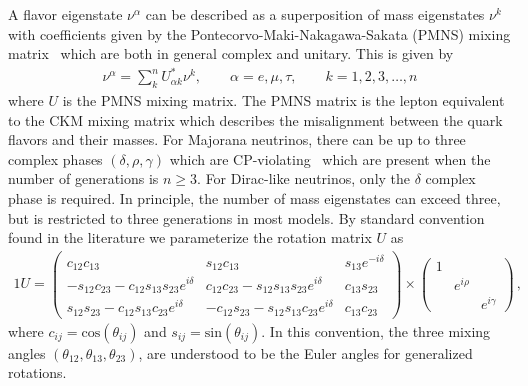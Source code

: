 \documentclass[universe,article,submit,moreauthors,pdftex,a4paper]{Definitions/mdpi}
\begin{document}
A flavor eigenstate $\nu^{\alpha}$ can be described as a superposition of mass eigenstates $\nu^{k}$ with coefficients given by the Pontecorvo-Maki-Nakagawa-Sakata (PMNS) mixing matrix~\cite{King:2013eh,FernandezMartinez:2016lgt} which are both in general  complex and unitary. This is given by
\begin{align}\label{NuFlavors}
	\nu^{\alpha}=\sum_k^nU^\ast_{\alpha k}\nu^{k}, \qquad\alpha=e,\mu,\tau,\qquad k=1,2,3,\dots,n
\end{align}
where $U$ is the PMNS mixing matrix. The PMNS matrix is the lepton equivalent to the CKM mixing matrix which describes the misalignment between the quark flavors and their masses. For Majorana neutrinos, there can be up to three complex phases $(\delta,\rho,\gamma)$ which are CP-violating~\cite{Pascoli:2006ci} which are present when the number of generations is $n\geq3$. For Dirac-like neutrinos, only the $\delta$ complex phase is required. In principle, the number of mass eigenstates can exceed three, but is restricted to three generations in most models. By standard convention~\cite{schwartz2014quantum} found in the literature we parameterize the rotation matrix $U$ as
	\begin{alignat}{1}
 	\label{PMNS} U =
		\begin{pmatrix}
			c_{12}c_{13} & s_{12}c_{13} & s_{13}e^{-i\delta}\\
			-s_{12}c_{23} - c_{12}s_{13}s_{23}e^{i\delta} & c_{12}c_{23} - s_{12}s_{13}s_{23}e^{i\delta} & c_{13}s_{23}\\
			s_{12}s_{23} - c_{12}s_{13}c_{23}e^{i\delta}& -c_{12}s_{23} - s_{12}s_{13}c_{23}e^{i\delta} & c_{13}c_{23}
		\end{pmatrix}\times
        \begin{pmatrix}
            1 & &\\
            & e^{i\rho} &\\
            & & e^{i\gamma}
        \end{pmatrix}\,,
	\end{alignat}
where $c_{ij} = \mathrm{cos}(\theta_{ij})$ and $s_{ij} = \mathrm{sin}(\theta_{ij})$. In this convention, the three mixing angles $(\theta_{12}, \theta_{13}, \theta_{23})$, are understood to be the Euler angles for generalized rotations.
\end{document}
